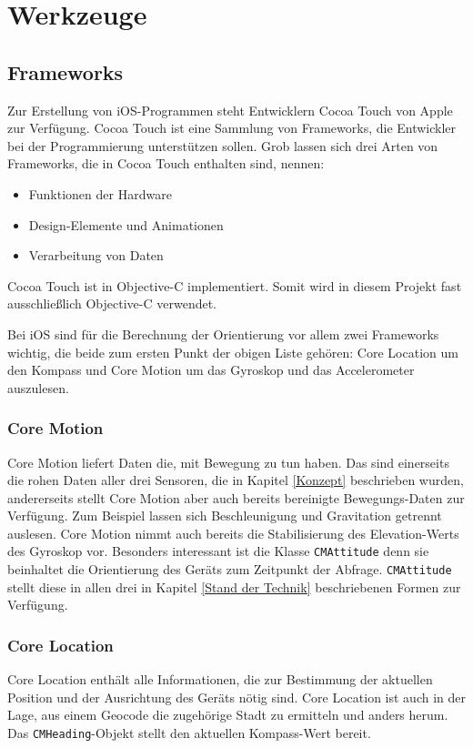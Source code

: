 \section{Werkzeuge}

\subsection{Frameworks}
Zur Erstellung von iOS-Programmen steht Entwicklern Cocoa Touch von Apple zur Verfügung. Cocoa Touch ist eine Sammlung von Frameworks, die Entwickler bei der Programmierung unterstützen sollen. Grob lassen sich drei Arten von Frameworks, die in Cocoa Touch enthalten sind, nennen:

\begin{itemize}
\item Funktionen der Hardware
\item Design-Elemente und Animationen
\item Verarbeitung von Daten
\end{itemize}

Cocoa Touch ist in Objective-C implementiert. Somit wird in diesem Projekt fast ausschließlich Objective-C verwendet. \cite{apple:002}

Bei iOS sind für die Berechnung der Orientierung vor allem zwei Frameworks wichtig, die beide zum ersten Punkt der obigen Liste gehören: Core Location um den Kompass und Core Motion um das Gyroskop und das Accelerometer auszulesen.\\

\subsubsection{Core Motion}
Core Motion liefert Daten die, mit Bewegung zu tun haben. Das sind einerseits die rohen Daten aller drei Sensoren, die in Kapitel \ref{Konzept} beschrieben wurden, andererseits stellt Core Motion aber auch bereits bereinigte Bewegungs-Daten zur Verfügung. Zum Beispiel lassen sich Beschleunigung und Gravitation getrennt auslesen. Core Motion nimmt auch bereits die Stabilisierung des Elevation-Werts des Gyroskop vor. Besonders interessant ist die Klasse \texttt{CMAttitude} denn sie beinhaltet die Orientierung des Geräts zum Zeitpunkt der Abfrage. \texttt{CMAttitude} stellt diese in allen drei in Kapitel \ref{Stand der Technik} beschriebenen Formen zur Verfügung.

\subsubsection{Core Location}
Core Location enthält alle Informationen, die zur Bestimmung der aktuellen Position und der Ausrichtung des Geräts nötig sind. Core Location ist auch in der Lage, aus einem Geocode die zugehörige Stadt zu ermitteln und anders herum. Das \texttt{CMHeading}-Objekt stellt den aktuellen Kompass-Wert bereit.

